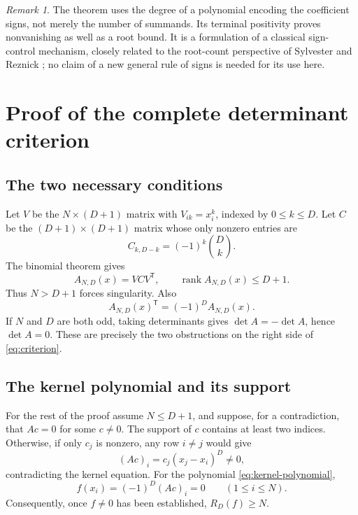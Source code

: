\documentclass[11pt,a4paper]{article}
\numberwithin{equation}{section}
\theoremstyle{remark}
\newtheorem{remark}[theorem]{Remark}
\newcommand{\rank}{\operatorname{rank}}
\begin{document}
\begin{remark}\label{rem:role}
The theorem uses the degree of a polynomial encoding the coefficient signs,
not merely the number of summands. Its terminal positivity proves
nonvanishing as well as a root bound. It is a formulation of a classical
sign-control mechanism, closely related to the root-count perspective of
Sylvester and Reznick \cite{Reznick}; no claim of a new general rule of signs
is needed for its use here.
\end{remark}

\section{Proof of the complete determinant criterion}

\subsection{The two necessary conditions}

Let $V$ be the $N\times(D+1)$ matrix with $V_{ik}=x_i^k$, indexed by
$0\le k\le D$. Let $C$ be the $(D+1)\times(D+1)$ matrix whose only nonzero
entries are
\[
 C_{k,D-k}=(-1)^k\binom Dk.
\]
The binomial theorem gives
\begin{equation}\label{eq:factorization}
 A_{N,D}(x)=VCV^{\mathsf T},\qquad \rank A_{N,D}(x)\le D+1.
\end{equation}
Thus $N>D+1$ forces singularity. Also
\[
 A_{N,D}(x)^{\mathsf T}=(-1)^D A_{N,D}(x).
\]
If $N$ and $D$ are both odd, taking determinants gives
$\det A=-\det A$, hence $\det A=0$. These are precisely the two obstructions
on the right side of \eqref{eq:criterion}.

\subsection{The kernel polynomial and its support}

For the rest of the proof assume $N\le D+1$, and suppose, for a
contradiction, that $Ac=0$ for some $c\ne0$. The support of $c$ contains
at least two indices. Otherwise, if only $c_j$ is nonzero, any row $i\ne j$
would give
\[
 (Ac)_i=c_j(x_j-x_i)^D\ne0,
\]
contradicting the kernel equation.
For the polynomial \eqref{eq:kernel-polynomial},
\begin{equation}\label{eq:node-roots}
 f(x_i)=(-1)^D(Ac)_i=0\qquad(1\le i\le N).
\end{equation}
Consequently, once $f\ne0$ has been established, $R_D(f)\ge N$.
\end{document}
